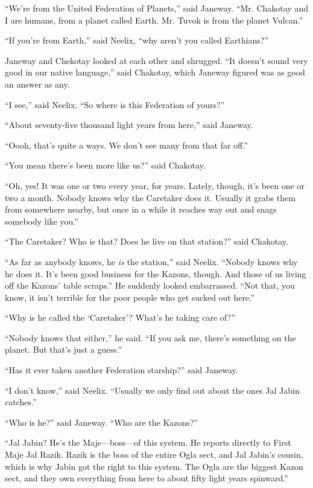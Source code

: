 \documentclass[twoside,letterpaper,12pt]{memoir}
\begin{document}
``We're from the United Federation of Planets,'' said Janeway. ``Mr. Chakotay and I are humans, from a planet called Earth. Mr. Tuvok is from the planet Vulcan.''

``If you're from Earth,'' said Neelix, ``why aren't you called Earthians?''

Janeway and Chekotay looked at each other and shrugged. ``It doesn't sound very good in our native language,'' said Chakotay, which Janeway figured was as good an answer as any.

``I see,'' said Neelix. ``So where is this Federation of yours?''

``About seventy-five thousand light years from here,'' said Janeway.

``Oooh, that's quite a ways. We don't see many from that far off.''

``You mean there's been more like us?'' said Chakotay.

``Oh, yes! It was one or two every year, for years. Lately, though, it's been one or two a month. Nobody knows why the Caretaker does it. Usually it grabs them from somewhere nearby, but once in a while it reaches way out and snags somebody like you.''

``The Caretaker? Who is that? Does he live on that station?'' said Chakotay.

``As far as anybody knows, he \textit{is} the station,'' said Neelix. ``Nobody knows why he does it. It's been good business for the Kazons, though. And those of us living off the Kazons' table scraps.'' He suddenly looked embarrassed. ``Not that, you know, it isn't terrible for the poor people who get sucked out here.''

``Why is he called the `Caretaker'? What's he taking care of?''

``Nobody knows that either,'' he said. ``If you ask me, there's something on the planet. But that's just a guess.''

``Has it ever taken another Federation starship?'' said Janeway.

``I don't know,'' said Neelix. ``Usually we only find out about the ones Jal Jabin catches.''

``Who is he?'' said Janeway. ``Who are the Kazons?''

``Jal Jabin? He's the Maje---boss---of this system. He reports directly to First Maje Jal Razik. Razik is the boss of the entire Ogla sect, and Jal Jabin’s cousin, which is why Jabin got the right to this system. The Ogla are the biggest Kazon sect, and they own everything from here to about fifty light years spinward.''
\end{document}
